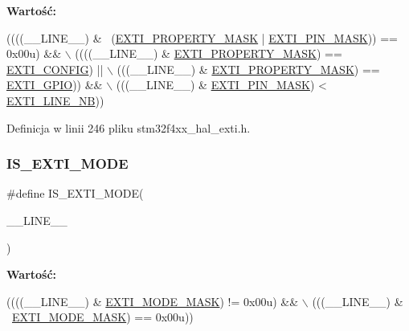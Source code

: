 {\bfseries Wartość\+:}
\begin{DoxyCode}
((((\_\_LINE\_\_) & ~(\hyperlink{group___e_x_t_i___private___constants_ga6aa8e044ea8987b6839f419123734e4b}{EXTI\_PROPERTY\_MASK} | \hyperlink{group___e_x_t_i___private___constants_ga755405defae45017e19a17fd0279869c}{EXTI\_PIN\_MASK})) == 0x00u) && \(\backslash\)
                                        ((((\_\_LINE\_\_) & \hyperlink{group___e_x_t_i___private___constants_ga6aa8e044ea8987b6839f419123734e4b}{EXTI\_PROPERTY\_MASK}) == 
      \hyperlink{group___e_x_t_i___private___constants_ga6f245ca02e17c1798fe43a66ea5b7fa4}{EXTI\_CONFIG})              || \(\backslash\)
                                         (((\_\_LINE\_\_) & \hyperlink{group___e_x_t_i___private___constants_ga6aa8e044ea8987b6839f419123734e4b}{EXTI\_PROPERTY\_MASK}) == 
      \hyperlink{group___e_x_t_i___private___constants_gacfa322960fc87db022536119cabb4d2a}{EXTI\_GPIO}))               && \(\backslash\)
                                         (((\_\_LINE\_\_) & \hyperlink{group___e_x_t_i___private___constants_ga755405defae45017e19a17fd0279869c}{EXTI\_PIN\_MASK}) < 
      \hyperlink{group___e_x_t_i___private___constants_ga577c4d3186ba6dd303761b23510595ef}{EXTI\_LINE\_NB}))
\end{DoxyCode}


Definicja w linii 246 pliku stm32f4xx\+\_\+hal\+\_\+exti.\+h.

\mbox{\label{group___e_x_t_i___private___macros_gaa8a0977af667f831424dcd75ecb6709b}} 
\subsubsection{\texorpdfstring{I\+S\+\_\+\+E\+X\+T\+I\+\_\+\+M\+O\+DE}{IS\_EXTI\_MODE}}
{\footnotesize\ttfamily \#define I\+S\+\_\+\+E\+X\+T\+I\+\_\+\+M\+O\+DE(\begin{DoxyParamCaption}\item[{}]{\+\_\+\+\_\+\+L\+I\+N\+E\+\_\+\+\_\+ }\end{DoxyParamCaption})}

{\bfseries Wartość\+:}
\begin{DoxyCode}
((((\_\_LINE\_\_) & \hyperlink{group___e_x_t_i___private___constants_ga657f081646b552ee10bdfc7af94b5cdf}{EXTI\_MODE\_MASK}) != 0x00u) && \(\backslash\)
                                         (((\_\_LINE\_\_) & ~\hyperlink{group___e_x_t_i___private___constants_ga657f081646b552ee10bdfc7af94b5cdf}{EXTI\_MODE\_MASK}) == 0x00u))
\end{DoxyCode}


